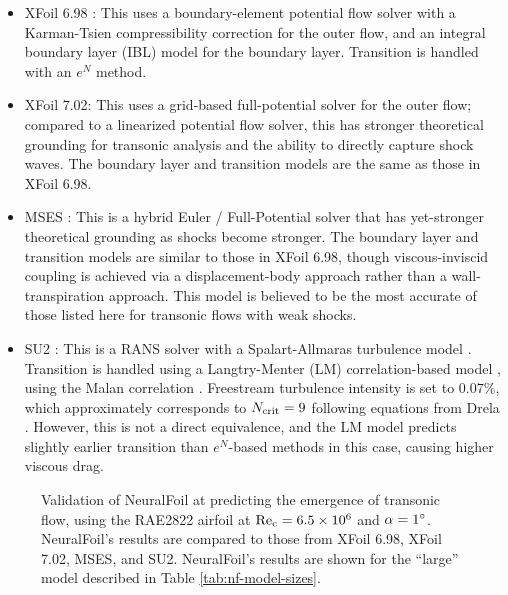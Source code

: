 \begin{itemize}
    \item XFoil 6.98 \cite{drela_xfoil_1989}: This uses a boundary-element potential flow solver with a Karman-Tsien compressibility correction for the outer flow, and an integral boundary layer (IBL) model for the boundary layer. Transition is handled with an $e^N$ method.
    \item XFoil 7.02: This uses a grid-based full-potential solver for the outer flow; compared to a linearized potential flow solver, this has stronger theoretical grounding for transonic analysis and the ability to directly capture shock waves. The boundary layer and transition models are the same as those in XFoil 6.98.
    \item MSES \cite{drela_user_2007}: This is a hybrid Euler / Full-Potential solver that has yet-stronger theoretical grounding as shocks become stronger. The boundary layer and transition models are similar to those in XFoil 6.98, though viscous-inviscid coupling is achieved via a displacement-body approach rather than a wall-transpiration approach. This model is believed to be the most accurate of those listed here for transonic flows with weak shocks.
    \item SU2 \cite{economon_su2_2016}: This is a RANS solver with a Spalart-Allmaras turbulence model \cite{spalart_oneequation_1992}. Transition is handled using a Langtry-Menter (LM) correlation-based model \cite{menter_correlationbased_2006}, using the Malan correlation \cite{menter_oneequation_2015}. Freestream turbulence intensity is set to $0.07\%$, which approximately corresponds to $N_{\rm crit}=9$ following equations from Drela \cite{drela_flight_2013}. However, this is not a direct equivalence, and the LM model predicts slightly earlier transition than $e^{N}$-based methods in this case, causing higher viscous drag.
\end{itemize}

\begin{figure}[H]
    \centering
    
    \caption{Validation of NeuralFoil at predicting the emergence of transonic flow, using the RAE2822 airfoil at $\rm Re_c=6.5 \times 10^6$ and $\alpha=1\degree$. NeuralFoil's results are compared to those from XFoil 6.98, XFoil 7.02, MSES, and SU2. NeuralFoil's results are shown for the ``large'' model described in Table \ref{tab:nf-model-sizes}.}
    \label{fig:nf-transonic-validation}
\end{figure}

